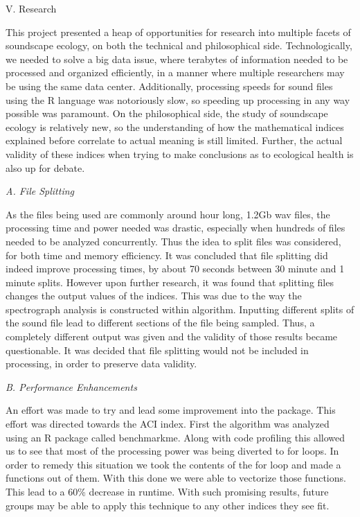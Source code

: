 \begin{center}
V. Research
\end{center}
\begin{flushleft}
\setlength{\parindent}{0.125in}
This project presented a heap of opportunities for research into multiple facets of soundscape ecology, on both the technical and philosophical side. Technologically, we needed to solve a big data issue, where terabytes of information needed to be processed and organized efficiently, in a manner where multiple researchers may be using the same data center. Additionally, processing speeds for sound files using the R language was notoriously slow, so speeding up processing in any way possible was paramount. On the philosophical side, the study of soundscape ecology is relatively new, so the understanding of how the mathematical indices explained before correlate to actual meaning is still limited. Further, the actual validity of these indices when trying to make conclusions as to ecological health is also up for debate.\par

\noindent\textit{A. File Splitting}\par
As the files being used are commonly around hour long, 1.2Gb wav files, the processing time and power needed was drastic, especially when hundreds of files needed to be analyzed concurrently. Thus the idea to split files was considered, for both time and memory efficiency. It was concluded that file splitting did indeed improve processing times, by about 70 seconds between 30 minute and 1 minute splits. However upon further research, it was found that splitting files changes the output values of the indices. This was due to the way the spectrograph analysis is constructed within algorithm. Inputting different splits of the sound file lead to different sections of the file being sampled. Thus, a completely different output was given and the validity of those results became questionable. It was decided that file splitting would not be included in processing, in order to preserve data validity.\par

\noindent\textit{B. Performance Enhancements}\par
An effort was made to try and lead some improvement into the package. This effort was directed towards the ACI index. First the algorithm was analyzed using an R package called benchmarkme. Along with code profiling this allowed us to see that most of the processing power was being diverted to for loops. In order to remedy this situation we took the contents of the for loop and made a functions out of them. With this done we were able to vectorize those functions. This lead to a 60\% decrease in runtime. With such promising results, future groups may be able to apply this technique to any other indices they see fit.\par


\end{flushleft}
